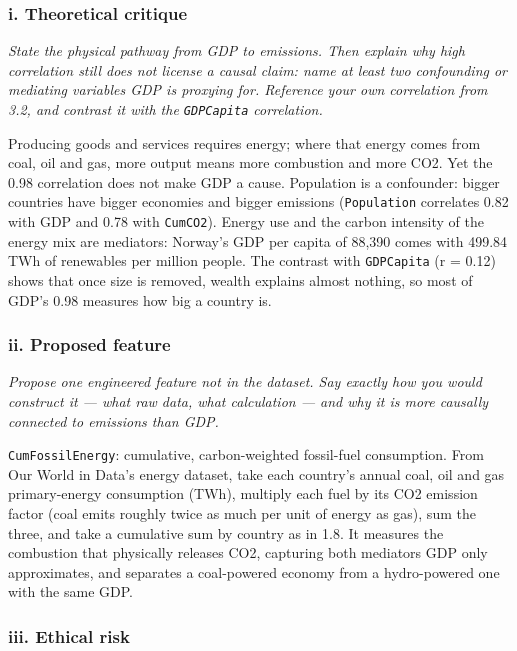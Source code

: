 \documentclass[
]{article}
\begin{document}
\subsubsection{i. Theoretical critique}\label{i.-theoretical-critique}

\emph{State the physical pathway from GDP to emissions. Then explain why
high correlation still does not license a causal claim: name at least
two confounding or mediating variables GDP is proxying for. Reference
your own correlation from 3.2, and contrast it with the
\texttt{GDPCapita} correlation.}

Producing goods and services requires energy; where that energy comes
from coal, oil and gas, more output means more combustion and more CO2.
Yet the 0.98 correlation does not make GDP a cause. Population is a
confounder: bigger countries have bigger economies and bigger emissions
(\texttt{Population} correlates 0.82 with GDP and 0.78 with
\texttt{CumCO2}). Energy use and the carbon intensity of the energy mix
are mediators: Norway's GDP per capita of 88,390 comes with 499.84 TWh
of renewables per million people. The contrast with \texttt{GDPCapita}
(r = 0.12) shows that once size is removed, wealth explains almost
nothing, so most of GDP's 0.98 measures how big a country is.

\subsubsection{ii. Proposed feature}\label{ii.-proposed-feature}

\emph{Propose one engineered feature not in the dataset. Say exactly how
you would construct it --- what raw data, what calculation --- and why
it is more causally connected to emissions than GDP.}

\texttt{CumFossilEnergy}: cumulative, carbon-weighted fossil-fuel
consumption. From Our World in Data's energy dataset, take each
country's annual coal, oil and gas primary-energy consumption (TWh),
multiply each fuel by its CO2 emission factor (coal emits roughly twice
as much per unit of energy as gas), sum the three, and take a cumulative
sum by country as in 1.8. It measures the combustion that physically
releases CO2, capturing both mediators GDP only approximates, and
separates a coal-powered economy from a hydro-powered one with the same
GDP.

\subsubsection{iii. Ethical risk}\label{iii.-ethical-risk}
\end{document}
